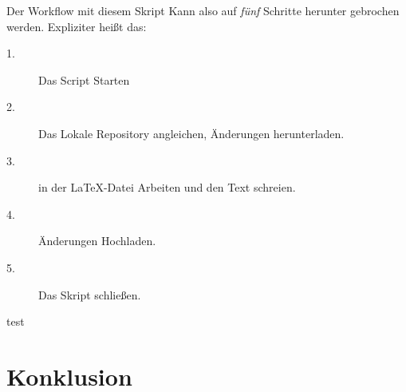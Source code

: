 \documentclass[12pt,a4paper]{scrartcl}
\begin{document}
Der Workflow mit diesem Skript Kann also auf \emph{fünf} Schritte herunter gebrochen werden. Expliziter heißt das:
\begin{description}
\item[1.] Das Script Starten
\item[2.] Das Lokale Repository angleichen, Änderungen herunterladen.
\item[3.] in der \LaTeX -Datei Arbeiten und den Text schreien.
\item[4.] Änderungen Hochladen.
\item[5.] Das Skript schließen.
\end{description}

test

\section{Konklusion}
\end{document}
